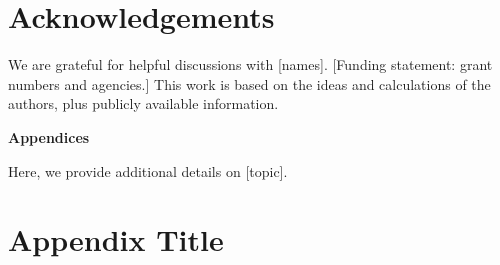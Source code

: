 \documentclass[aps,prd,twocolumn,superscriptaddress,bibnotes,longbibliography,
               preprintnumbers,floatfix,10pt]{revtex4-2}
\begin{document}


\section*{Acknowledgements}

We are grateful for helpful discussions with [names].
[Funding statement: grant numbers and agencies.]
This work is based on the ideas and calculations of the authors, plus publicly available information.


\appendix
{}
\vspace{0.75cm}
\centerline{\Large {\bf Appendices}}
\vspace{0.75cm}

Here, we provide additional details on [topic].


\section{Appendix Title}
\label{app:name}



\clearpage

\end{document}
